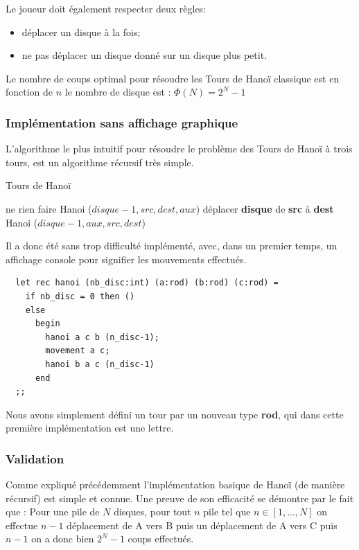 \documentclass[a4paper,11pt]{article}
\begin{document}
Le joueur doit également respecter deux règles:
\begin{itemize}
\item déplacer un disque à la fois;
\item ne pas déplacer un disque donné sur un disque plus petit.
\end{itemize}

Le nombre de coups optimal pour résoudre les Tours de Hanoï classique est en fonction de $n$ le nombre de disque est : \(\Phi(N) = 2^{N}-1\)

\subsubsection{Implémentation sans affichage graphique}
\label{sec:algoBase}
L'algorithme le plus intuitif pour résoudre le problème des Tours de Hanoï à trois tours,
est un algorithme récursif très simple.

\begin{algorithm}
  \caption{Tours de Hanoï}\label{algo:hanoi1}
  \begin{algorithmic}[1]
     
    ne rien faire
    \Else
    \State Hanoi ($disque - 1, src, dest, aux$)
    \State déplacer \textbf{disque} de \textbf{src} à \textbf{dest}
    \State Hanoi ($disque - 1, aux, src, dest$)
    \EndIf
    \EndProcedure
\end{algorithmic}
\end{algorithm}

Il a donc été sans trop difficulté implémenté, avec, dans un premier temps,  un affichage console pour signifier les mouvements effectués.
\begin{lstlisting}
  let rec hanoi (nb_disc:int) (a:rod) (b:rod) (c:rod) =
    if nb_disc = 0 then ()
    else
      begin
        hanoi a c b (n_disc-1);
        movement a c;
        hanoi b a c (n_disc-1)
      end
  ;;
\end{lstlisting}

Nous avons simplement défini un tour par un nouveau type \textbf{rod}, qui dans cette première implémentation est une lettre.

\subsubsection{Validation}

Comme expliqué précédemment l'implémentation basique de Hanoï (de manière récursif) est simple et connue.
Une preuve de son efficacité se démontre par le fait que :
Pour une pile de $N$ disques, pour tout $n$ pile tel que $n \in [1,...,N]$ on effectue $n-1$ déplacement de A vers B puis un déplacement de A vers C puis $n-1$ on a donc bien $2^{N} - 1$ coups effectués.
\end{document}
